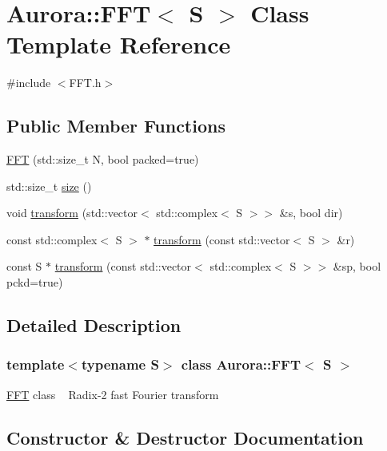 \hypertarget{class_aurora_1_1_f_f_t}{}\section{Aurora\+:\+:F\+FT$<$ S $>$ Class Template Reference}
\label{class_aurora_1_1_f_f_t}


{\ttfamily \#include $<$F\+F\+T.\+h$>$}

\subsection*{Public Member Functions}
\begin{DoxyCompactItemize}
\item 
\hyperlink{class_aurora_1_1_f_f_t_ab98366f22f4fde5a1b0e32445eedcf3c}{F\+FT} (std\+::size\+\_\+t N, bool packed=true)
\item 
std\+::size\+\_\+t \hyperlink{class_aurora_1_1_f_f_t_ad0149c60672d3f4e64850dde22f5b163}{size} ()
\item 
void \hyperlink{class_aurora_1_1_f_f_t_a8325de64c8b9f208ed0bc8db3f74e4c7}{transform} (std\+::vector$<$ std\+::complex$<$ S $>$$>$ \&s, bool dir)
\item 
const std\+::complex$<$ S $>$ $\ast$ \hyperlink{class_aurora_1_1_f_f_t_a51ed1e25953c12b7f4cc145d19ee5cd8}{transform} (const std\+::vector$<$ S $>$ \&r)
\item 
const S $\ast$ \hyperlink{class_aurora_1_1_f_f_t_aa0912d8abdeb15ff84d82a5cc59cb150}{transform} (const std\+::vector$<$ std\+::complex$<$ S $>$$>$ \&sp, bool pckd=true)
\end{DoxyCompactItemize}


\subsection{Detailed Description}
\subsubsection*{template$<$typename S$>$\newline
class Aurora\+::\+F\+F\+T$<$ S $>$}

\hyperlink{class_aurora_1_1_f_f_t}{F\+FT} class ~\newline
Radix-\/2 fast Fourier transform 

\subsection{Constructor \& Destructor Documentation}
\mbox{\label{class_aurora_1_1_f_f_t_ab98366f22f4fde5a1b0e32445eedcf3c}} 
